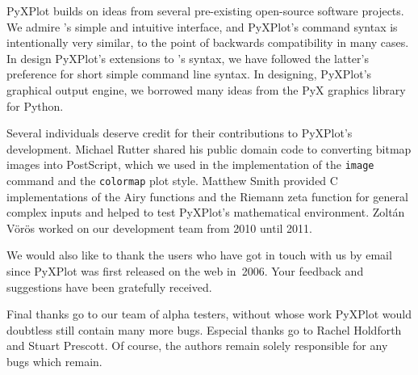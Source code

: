 PyXPlot builds on ideas from several pre-existing open-source software
projects.  We admire \gnuplot's simple and intuitive interface, and PyXPlot's
command syntax is intentionally very similar, to the point of backwards
compatibility in many cases. In design PyXPlot's extensions to \gnuplot's
syntax, we have followed the latter's preference for short simple command line
syntax.  In designing, PyXPlot's graphical output engine, we borrowed many
ideas from the PyX graphics library for Python.

Several individuals deserve credit for their contributions to PyXPlot's
development. Michael Rutter shared his public domain code to converting bitmap
images into PostScript, which we used in the implementation of the {\tt image}
command and the {\tt colormap} plot style. Matthew Smith provided C
implementations of the Airy functions and the Riemann zeta function for general
complex inputs and helped to test PyXPlot's mathematical environment. Zolt\'an
V\"or\"os worked on our development team from 2010 until 2011.

We would also like to thank the users who have got in touch with us by email
since PyXPlot was first released on the web in~2006. Your feedback and
suggestions have been gratefully received.

Final thanks go to our team of alpha testers, without whose work PyXPlot would
doubtless still contain many more bugs.  Especial thanks go to Rachel Holdforth
and Stuart Prescott. Of course, the authors remain solely responsible for any
bugs which remain.

